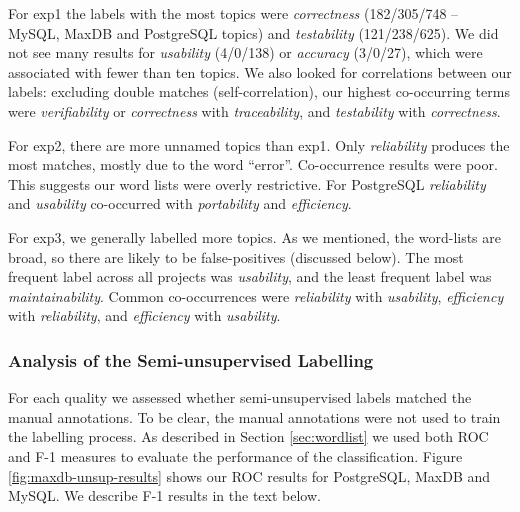 \documentclass[smallextended]{svjour3}       %
\begin{document}
\begin{table}
\end{table}

For \textsf{exp1} the labels with the most topics
were
\emph{correctness} (182/305/748 -- MySQL, MaxDB and PostgreSQL topics) and \emph{testability} (121/238/625). 
We did not see many results for \emph{usability} (4/0/138) or
\emph{accuracy} (3/0/27), which were associated with fewer than ten topics. 
We also looked for correlations between our labels: excluding double
matches (self-correlation), our highest co-occurring terms were
\emph{verifiability} or \emph{correctness}
with \emph{traceability}, and \emph{testability} with \emph{correctness}.%



For \textsf{exp2}, there are more unnamed topics than \textsf{exp1}. 
Only \emph{reliability} produces the most matches, mostly due to the word ``error''. 
Co-occurrence results were poor. This suggests our word lists were overly restrictive.
For PostgreSQL \emph{reliability} and  \emph{usability} co-occurred
with \emph{portability} and \emph{efficiency}.


For \textsf{exp3}, we generally labelled more topics. 
As we mentioned, the word-lists are broad, so there are likely to be false-positives (discussed below). 
The most frequent label across all projects was \emph{usability}, and the
least frequent label was \emph{maintainability}. 
Common co-occurrences were \emph{reliability} with \emph{usability}, \emph{efficiency} with \emph{reliability}, and \emph{efficiency} with \emph{usability}.




\subsubsection{Analysis of the Semi-unsupervised Labelling} %
For each quality we assessed whether semi-unsupervised labels matched the manual annotations. 
To be clear, the manual annotations were not used to
train the labelling process.
As described in Section \ref{sec:wordlist} we used both ROC and F-1 measures to evaluate the performance of the classification.
Figure \ref{fig:maxdb-unsup-results} shows our ROC results for PostgreSQL, MaxDB and MySQL. We describe F-1 results in the text below.
\end{document}
